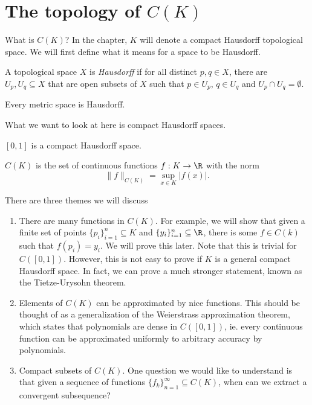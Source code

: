 \documentclass[a4paper]{article}
\begin{document}
\section{The topology of \texorpdfstring{$C(K)$}{C(K)}}
What is $C(K)$? In the chapter, $K$ will denote a compact Hausdorff topological space. We will first define what it means for a space to be Hausdorff.

\begin{defi}
  A topological space $X$ is \emph{Hausdorff} if for all distinct $p, q \in X$, there are $U_p, U_q \subseteq X$ that are open subsets of $X$ such that $p \in U_p$, $q\in U_q$ and $U_p\cap U_q = \emptyset$.
\end{defi}

\begin{eg}
  Every metric space is Hausdorff.
\end{eg}

What we want to look at here is compact Hausdorff spaces.
\begin{eg}
  $[0, 1]$ is a compact Hausdorff space.
\end{eg}

\begin{notation}
  $C(K)$ is the set of continuous functions $f: K \to \R$ with the norm
  \[
    \|f\|_{C(K)}  = \sup_{x \in K} |f(x)|.
  \]
\end{notation}
There are three themes we will discuss
\begin{enumerate}
  \item There are many functions in $C(K)$. For example, we will show that given a finite set of points $\{p_i\}_{i = 1}^n \subseteq K$ and $\{y_i\}_{i = 1}^n \subseteq \R$, there is some $f \in C(k)$ such that $f(p_i) = y_i$. We will prove this later. Note that this is trivial for $C([0, 1])$. However, this is not easy to prove if $K$ is a general compact Hausdorff space. In fact, we can prove a much stronger statement, known as the Tietze-Urysohn theorem.

  \item Elements of $C(K)$ can be approximated by nice functions. This should be thought of as a generalization of the Weierstrass approximation theorem, which states that polynomials are dense in $C([0, 1])$, ie. every continuous function can be approximated uniformly to arbitrary accuracy by polynomials.

  \item Compact subsets of $C(K)$. One question we would like to understand is that given a sequence of functions $\{f_k\}_{n = 1}^\infty \subseteq C(K)$, when can we extract a convergent subsequence?
\end{enumerate}
\end{document}
